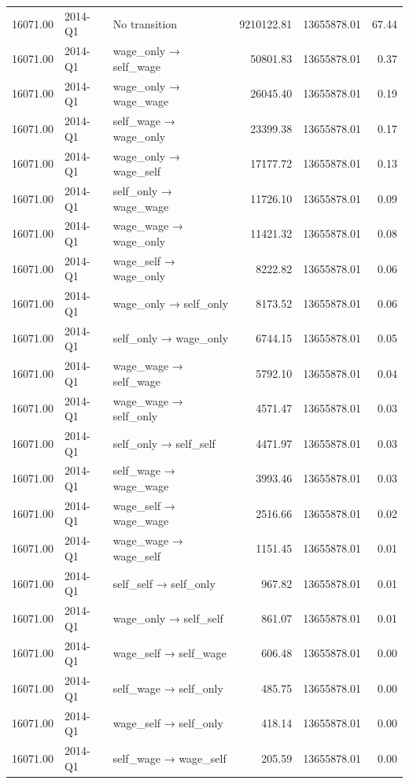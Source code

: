 \begin{table}[ht]
{\begin{tabular}{rllrrr}
  16071.00 & 2014-Q1 & No transition & 9210122.81 & 13655878.01 & 67.44 \\ 
  16071.00 & 2014-Q1 & wage\_only → self\_wage & 50801.83 & 13655878.01 & 0.37 \\ 
  16071.00 & 2014-Q1 & wage\_only → wage\_wage & 26045.40 & 13655878.01 & 0.19 \\ 
  16071.00 & 2014-Q1 & self\_wage → wage\_only & 23399.38 & 13655878.01 & 0.17 \\ 
  16071.00 & 2014-Q1 & wage\_only → wage\_self & 17177.72 & 13655878.01 & 0.13 \\ 
  16071.00 & 2014-Q1 & self\_only → wage\_wage & 11726.10 & 13655878.01 & 0.09 \\ 
  16071.00 & 2014-Q1 & wage\_wage → wage\_only & 11421.32 & 13655878.01 & 0.08 \\ 
  16071.00 & 2014-Q1 & wage\_self → wage\_only & 8222.82 & 13655878.01 & 0.06 \\ 
  16071.00 & 2014-Q1 & wage\_only → self\_only & 8173.52 & 13655878.01 & 0.06 \\ 
  16071.00 & 2014-Q1 & self\_only → wage\_only & 6744.15 & 13655878.01 & 0.05 \\ 
  16071.00 & 2014-Q1 & wage\_wage → self\_wage & 5792.10 & 13655878.01 & 0.04 \\ 
  16071.00 & 2014-Q1 & wage\_wage → self\_only & 4571.47 & 13655878.01 & 0.03 \\ 
  16071.00 & 2014-Q1 & self\_only → self\_self & 4471.97 & 13655878.01 & 0.03 \\ 
  16071.00 & 2014-Q1 & self\_wage → wage\_wage & 3993.46 & 13655878.01 & 0.03 \\ 
  16071.00 & 2014-Q1 & wage\_self → wage\_wage & 2516.66 & 13655878.01 & 0.02 \\ 
  16071.00 & 2014-Q1 & wage\_wage → wage\_self & 1151.45 & 13655878.01 & 0.01 \\ 
  16071.00 & 2014-Q1 & self\_self → self\_only & 967.82 & 13655878.01 & 0.01 \\ 
  16071.00 & 2014-Q1 & wage\_only → self\_self & 861.07 & 13655878.01 & 0.01 \\ 
  16071.00 & 2014-Q1 & wage\_self → self\_wage & 606.48 & 13655878.01 & 0.00 \\ 
  16071.00 & 2014-Q1 & self\_wage → self\_only & 485.75 & 13655878.01 & 0.00 \\ 
  16071.00 & 2014-Q1 & wage\_self → self\_only & 418.14 & 13655878.01 & 0.00 \\ 
  16071.00 & 2014-Q1 & self\_wage → wage\_self & 205.59 & 13655878.01 & 0.00 \\ 

\end{tabular}}
\end{table}
